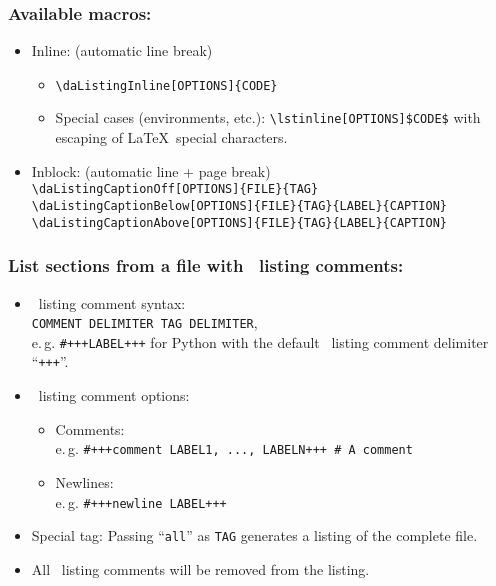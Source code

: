 		\subsubsection*{Available macros:}
			\vspace{-0.25cm}
			\begin{itemize}
				\item Inline: (automatic line break)
					\begin{itemize}
						\setlength\itemsep{-0.25em}
						\item \lstinline$\daListingInline[OPTIONS]{CODE}$
						\item Special cases (environments, etc.): \lstinline{\lstinline[OPTIONS]$CODE$} with escaping of \LaTeX~special characters.
					\end{itemize}
				\item Inblock: (automatic line + page break)\\
				 \lstinline$\daListingCaptionOff[OPTIONS]{FILE}{TAG}$\\ \lstinline$\daListingCaptionBelow[OPTIONS]{FILE}{TAG}{LABEL}{CAPTION}$\\
				 \lstinline$\daListingCaptionAbove[OPTIONS]{FILE}{TAG}{LABEL}{CAPTION}$
			\end{itemize}
		
		\subsubsection*{List sections from a file with \productName~listing comments:}
			\vspace{-0.25cm}
			\begin{itemize}
				\setlength\itemsep{-0.125em}
				\item \productName~listing comment syntax:\\
				\lstinline$COMMENT DELIMITER TAG DELIMITER$,\\
				\mbox{e.\,g.} \lstinline$#+++LABEL+++$ for Python with the default \productName~listing comment delimiter \enquote{\lstinline$+++$}.
				\item \productName~listing comment options:
				\begin{itemize}
					\item Comments:\\
						\mbox{e.\,g.} \lstinline$#+++comment LABEL1, ..., LABELN+++ # A comment$
					\item Newlines:\\
						\mbox{e.\,g.} \lstinline$#+++newline LABEL+++$
				\end{itemize}
				\item Special tag: Passing \enquote{\lstinline$all$} as \lstinline$TAG$ generates a listing of the complete file.
				\item All \productName~listing comments will be removed from the listing.
			\end{itemize}
		
